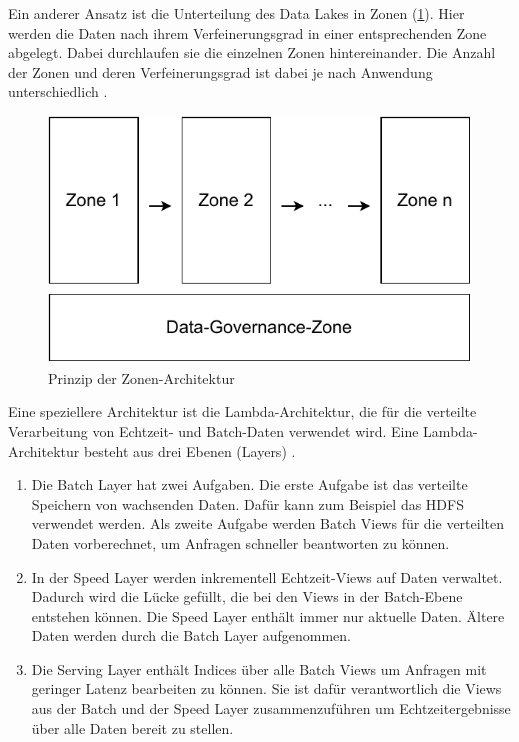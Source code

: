 Ein anderer Ansatz ist die Unterteilung des Data Lakes in Zonen (\cref{fig:datalake-zones}).
Hier werden die Daten nach ihrem Verfeinerungsgrad in einer entsprechenden Zone abgelegt.
Dabei durchlaufen sie die einzelnen Zonen hintereinander.
Die Anzahl der Zonen und deren Verfeinerungsgrad ist dabei je nach Anwendung unterschiedlich \parencite{dl-zones}.

\begin{figure}
    \centering
    \includegraphics[width=.8\textwidth]{Grafiken/Grundlagen-Zones.pdf}
    \caption{Prinzip der Zonen-Architektur}
    \label{fig:datalake-zones}
\end{figure}

Eine speziellere Architektur ist die Lambda-Architektur, die für die verteilte Verarbeitung von Echtzeit- und Batch-Daten verwendet wird.
Eine Lambda-Architektur besteht aus drei Ebenen (Layers) \parencite{lambda-arch}. \begin{enumerate}
    \item Die Batch Layer hat zwei Aufgaben.
    Die erste Aufgabe ist das verteilte Speichern von wachsenden Daten.
    Dafür kann zum Beispiel das HDFS verwendet werden.
    Als zweite Aufgabe werden Batch Views für die verteilten Daten vorberechnet, um Anfragen schneller beantworten zu können.
    \item In der Speed Layer werden inkrementell Echtzeit-Views auf Daten verwaltet.
    Dadurch wird die Lücke gefüllt, die bei den Views in der Batch-Ebene entstehen können.
    Die Speed Layer enthält immer nur aktuelle Daten.
    Ältere Daten werden durch die Batch Layer aufgenommen.
    \item Die Serving Layer enthält Indices über alle Batch Views um Anfragen mit geringer Latenz bearbeiten zu können. Sie ist dafür verantwortlich die Views aus der Batch und der Speed Layer zusammenzuführen um Echtzeitergebnisse über alle Daten bereit zu stellen.
\end{enumerate}

